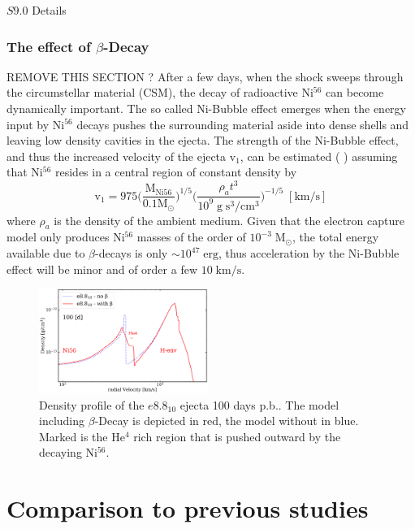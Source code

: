 \documentclass[fleqn,usenatbib]{mnras}
\newcommand{\helium}{$\mathrm{He^{4}}$\xspace}
\newcommand{\nickel}{$\mathrm{Ni^{56}}$\xspace}
\newcommand{\COM}[1]{{\color{red}#1}}
\begin{document}
\COM{$S9.0$ Details}


\subsubsection{The effect of $\beta$-Decay}
\COM{REMOVE THIS SECTION ?}
After a few days, when the shock sweeps through the circumstellar material (CSM), the decay of radioactive \nickel can become dynamically important. The so called Ni-Bubble effect emerges when the energy input by \nickel decays pushes the surrounding material aside into dense shells and leaving low density cavities in the ejecta. The strength of the Ni-Bubble effect, and thus the increased velocity of the ejecta $\mathrm{v}_1$,  can be estimated (\cite{Chevalier2005} ) assuming that \nickel resides in a central region of constant density by
\begin{equation}
\mathrm{v_1} = 975\Big(\frac{\mathrm{M_{Ni56}}}{0.1\mathrm{M_{\odot}}} \Big)^{1/5} \Big( \frac{\rho_a t^3} {10^9 \mathrm{\;g\;s^3/cm^3}}\Big)^{-1/5}\; \mathrm{[km/s]}
\end{equation}
where $\rho_a$ is the density of the ambient medium. Given that the electron capture model only produces \nickel masses of the order of $10^{-3}\;\mathrm{M_{\odot}}$, the total energy available due to $\beta$-decays is only $\sim 10^{47}\;\mathrm{erg}$, thus acceleration by the Ni-Bubble effect will be minor and of order a few $10\;\mathrm{km/s}$.

\begin{figure}
 \label{fig:e8_beta}
 \centering
 \includegraphics[width=0.49\textwidth]{./pic/e8_10_beta_nobeta_den_vs_vr.pdf}
 \caption{Density profile of the $e8.8_{10}$ ejecta 100 days p.b.. The model including $\beta$-Decay is depicted in red, the model without in blue. Marked is the \helium rich region that is pushed outward by the decaying \nickel. }
\end{figure}

\section{Comparison to previous studies}
\label{sec:Comparison to previous studies}
\end{document}
